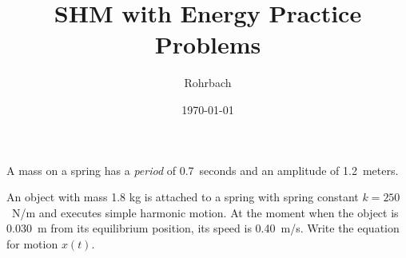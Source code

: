 \documentclass[10pt]{exam}
\title{SHM with Energy Practice Problems}
\author{Rohrbach}
\date{\today}
\begin{document}
\maketitle

\begin{questions}



\question 
  A mass on a spring has a \emph{period} of 0.7~seconds and an amplitude of 1.2~meters.


  \vs

\question 
  An object with mass 1.8 kg is attached to a spring with spring constant $k=250$~N/m and executes simple harmonic motion. At the moment when the object is 0.030~m from its equilibrium position, its speed is 0.40~m/s.  Write the equation for motion $x(t)$.

  \vs

\end{questions}
\end{document}
